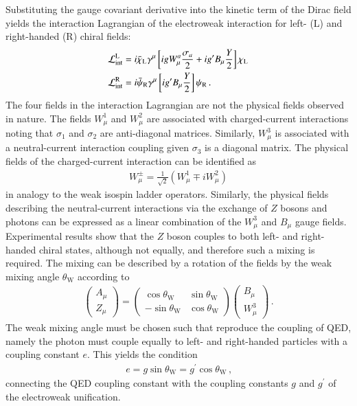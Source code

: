 Substituting the gauge covariant derivative into the kinetic term of the Dirac
field yields the interaction Lagrangian of the electroweak interaction for left-
(L) and right-handed (R) chiral fields:
\begin{align}
  &\mathcal{L}_{\text{int}}^{\text{L}} = i \bar{\chi}_{\text{L}} \gamma^\mu \left[i g W_\mu^a \frac{\sigma_a}{2} + i g^\prime B_\mu \frac{Y}{2} \right] \chi_{\text{L}} \label{eq:theory_electroweak_left} \\
  &\mathcal{L}_{\text{int}}^{\text{R}} = i \bar{\psi}_{\text{R}} \gamma^\mu \left[i g^\prime B_\mu \frac{Y}{2} \right] \psi_{\text{R}} \,\text{.} \label{eq:theory_electroweak_right}
\end{align}
The four fields in the interaction Lagrangian are not the physical fields
observed in nature. The fields $W_\mu^1$ and $W_\mu^2$ are associated with
charged-current interactions noting that $\sigma_1$ and $\sigma_2$ are
anti-diagonal matrices. Similarly, $W_\mu^3$ is associated with a
neutral-current interaction coupling given $\sigma_3$ is a diagonal matrix.  The
physical fields of the charged-current interaction can be identified as
\begin{align*}
  W_\mu^\pm = \frac{1}{\sqrt{2}} (W_\mu^1 \mp i W_\mu^2)
\end{align*}
in analogy to the weak isospin ladder operators. Similarly, the physical fields
describing the neutral-current interactions via the exchange of $Z$ bosons and
photons can be expressed as a linear combination of the $W_\mu^3$ and $B_\mu$
gauge fields. Experimental results show that the $Z$ boson couples to both left-
and right-handed chiral states, although not equally, and therefore such a
mixing is required. The mixing can be described by a rotation of the fields by
the weak mixing angle $\theta_{\text{W}}$ according to
\begin{align*}
  \begin{pmatrix}
    A_\mu \\
    Z_\mu
  \end{pmatrix}
  =
  \begin{pmatrix}
    \cos\theta_{\text{W}} & \sin\theta_{\text{W}} \\
    -\sin\theta_{\text{W}} & \cos\theta_{\text{W}}
  \end{pmatrix}
  \begin{pmatrix}
    B_\mu \\
    W_\mu^3
  \end{pmatrix} \,\text{.}
\end{align*}
The weak mixing angle must be chosen such that
 reproduce the
coupling of QED, namely the photon must couple equally to left- and right-handed
particles with a coupling constant $e$. This yields the condition
\begin{align*}
  e = g \sin\theta_{\text{W}} = g^\prime \cos\theta_{\text{W}} \,\text{,}
\end{align*}
connecting the QED coupling constant with the coupling constants $g$ and
$g^\prime$ of the electroweak unification.

